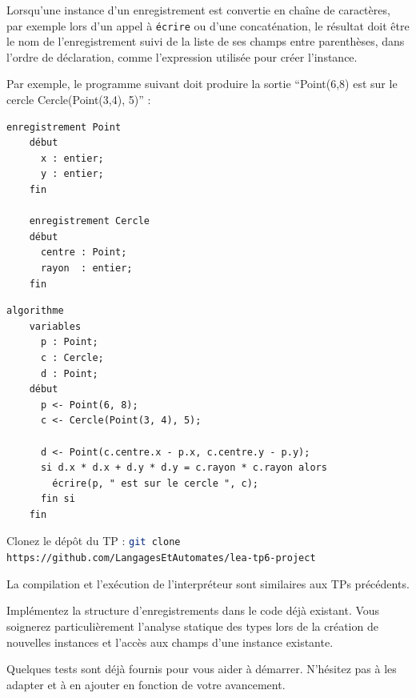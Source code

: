 \documentclass[livret]{td}
\begin{document}
Lorsqu'une instance d'un enregistrement est convertie en chaîne de caractères,
par exemple lors d'un appel à \lstinline{écrire} ou d'une concaténation,
le résultat doit être le nom de l'enregistrement suivi de la liste de ses
champs entre parenthèses, dans l'ordre de déclaration,
comme l'expression utilisée pour créer l'instance.

Par exemple, le programme suivant doit produire la sortie ``Point(6,8) est sur le cercle Cercle(Point(3,4), 5)'' :

\begin{minipage}{.3\textwidth}
  \begin{lstlisting}[gobble=2]
    enregistrement Point
    début
      x : entier;
      y : entier;
    fin
    
    enregistrement Cercle
    début
      centre : Point;
      rayon  : entier;
    fin
  \end{lstlisting}
\end{minipage}%
\begin{minipage}{.7\textwidth}
  \begin{lstlisting}[gobble=2]
    algorithme
    variables
      p : Point;
      c : Cercle;
      d : Point;
    début
      p <- Point(6, 8);
      c <- Cercle(Point(3, 4), 5);
    
      d <- Point(c.centre.x - p.x, c.centre.y - p.y);
      si d.x * d.x + d.y * d.y = c.rayon * c.rayon alors
        écrire(p, " est sur le cercle ", c);
      fin si
    fin
  \end{lstlisting}
\end{minipage}%

\vspace{-4mm}
\begin{exercice}

  \begin{questions}
  \item Clonez le dépôt du TP : \lstinline[language=bash]{git clone https://github.com/LangagesEtAutomates/lea-tp6-project}

    La compilation et l'exécution de l'interpréteur sont similaires aux TPs précédents.

  \item Implémentez la structure d'enregistrements dans le code déjà existant.
    Vous soignerez particulièrement l'analyse statique des types lors de la création de
    nouvelles instances et l'accès aux champs d'une instance existante. 
    
  \item Quelques tests sont déjà fournis pour vous aider à démarrer.
    N'hésitez pas à les adapter et à en ajouter en fonction de votre avancement. 
    
  \end{questions}

\end{exercice}
\end{document}
